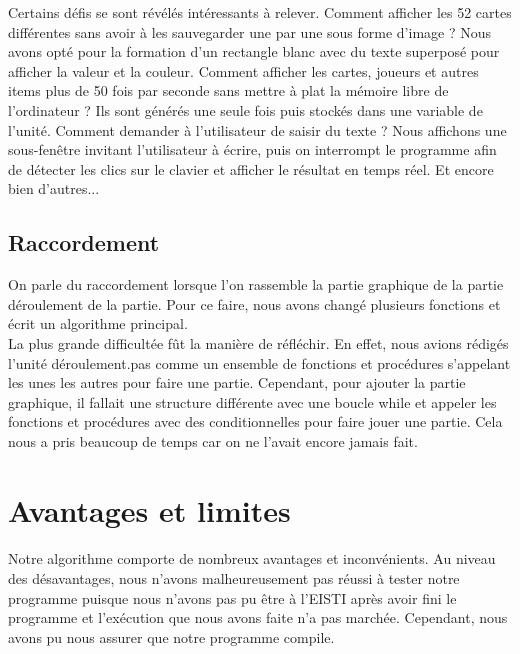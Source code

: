 \documentclass[12pt]{report}
\begin{document}
	Certains défis se sont révélés intéressants à relever. Comment afficher les 52 cartes différentes sans avoir à les sauvegarder une par une sous forme d'image ? Nous avons opté pour la formation d'un rectangle blanc avec du texte superposé pour afficher la valeur et la couleur. Comment afficher les cartes, joueurs et autres items plus de 50 fois par seconde sans mettre à plat la mémoire libre de l'ordinateur ? Ils sont générés une seule fois puis stockés dans une variable de l'unité. Comment demander à l'utilisateur de saisir du texte ? Nous affichons une sous-fenêtre invitant l'utilisateur à écrire, puis on interrompt le programme afin de détecter les clics sur le clavier et afficher le résultat en temps réel. Et encore bien d'autres...

\vspace{15pt}

\subsection{Raccordement}
	On parle du raccordement lorsque l'on rassemble la partie graphique de la partie déroulement de la partie. Pour ce faire, nous avons changé plusieurs fonctions et écrit un algorithme principal. \\
La plus grande difficultée fût la manière de réfléchir. En effet, nous avions rédigés l’unité déroulement.pas comme un ensemble de fonctions et procédures s’appelant les unes les autres pour faire une partie. Cependant, pour ajouter la partie graphique, il fallait une structure différente avec une boucle while et appeler les fonctions et procédures avec des conditionnelles pour faire jouer une partie. Cela nous a pris beaucoup de temps car on ne l’avait encore jamais fait. \\
 
\clearpage

\section{Avantages et limites}
\paragraph{} Notre algorithme comporte de nombreux avantages et inconvénients. Au niveau des désavantages, nous n’avons malheureusement pas réussi à tester notre programme puisque nous n’avons pas pu être à l’EISTI après avoir fini le programme et l’exécution que nous avons faite n’a pas marchée. Cependant, nous avons pu nous assurer que notre programme compile. \\
\end{document}
